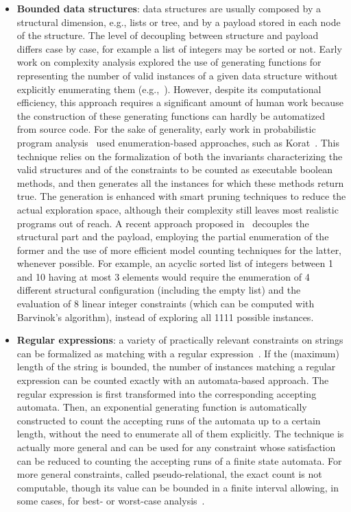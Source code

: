 \begin{itemize}
	\item \textbf{Bounded data structures}: data structures are usually composed by a structural dimension, e.g., lists or tree, and by a payload stored in each node of the structure. The level of decoupling between structure and payload differs case by case, for example a list of integers may be sorted or not. Early work on complexity analysis explored the use of generating functions for representing the number of valid instances of a given data structure without explicitly enumerating them (e.g.,~\cite{flajolet1985mathematical}). However, despite its computational efficiency, this approach requires a significant amount of human work because the construction of these generating functions can hardly be automatized from source code. For the sake of generality, early work in probabilistic program analysis~\cite{Filieri2013} used enumeration-based approaches, such as Korat~\cite{Korat2002}. This technique relies on the formalization of both the invariants characterizing the valid structures and of the constraints to be counted as executable boolean methods, and then generates all the instances for which these methods return true. The generation is enhanced with smart pruning techniques to reduce the actual exploration space, although their complexity still leaves most realistic programs out of reach. A recent approach proposed in~\cite{Filieri2015} decouples the structural part and the payload, employing the partial enumeration of the former and the use of more efficient model counting techniques for the latter, whenever possible. For example, an acyclic sorted list of integers between 1 and 10 having at most 3 elements would require the enumeration of 4 different structural configuration (including the empty list) and the evaluation of 8 linear integer constraints (which can be computed with Barvinok's algorithm), instead of exploring all 1111 possible instances.

	\item \textbf{Regular expressions}: a variety of practically relevant constraints on strings can be formalized as matching with a regular expression~\cite{Luu2014,Aydin2015}. If the (maximum) length of the string is bounded, the number of instances matching a regular expression can be counted exactly with an automata-based approach. The regular expression is first transformed into the corresponding accepting automata. Then, an exponential generating function is automatically constructed to count the accepting runs of the automata up to a certain length, without the need to enumerate all of them explicitly. The technique is actually more general and can be used for any constraint whose satisfaction can be reduced to counting the accepting runs of a finite state automata. For more general constraints, called pseudo-relational, the exact count is not computable, though its value can be bounded in a finite interval allowing, in some cases, for best- or worst-case analysis~\cite{Aydin2015}.
	

\end{itemize}
